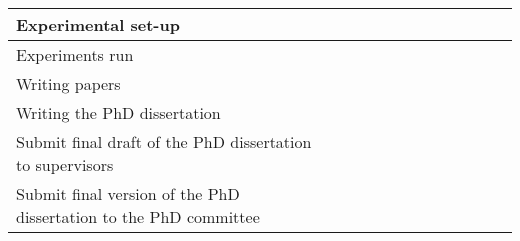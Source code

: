 \documentclass[authoryear,11pt]{elsarticle}
\begin{document}
\begin{table}[h!]
\begin{tabular}{|p{7cm}|c|c|c|c|c|c|c|c|c|c|c|c|}
		\hline
		Experimental set-up &\cellcolor{blue}&\cellcolor{blue}&&\cellcolor{blue}&
		\cellcolor{blue}&&\cellcolor[gray]{0.9}&\cellcolor[gray]{0.9}&&&&\\
		\hline
		Experiments run &&&\cellcolor{blue}&\cellcolor{blue}&&\cellcolor{blue}&\cellcolor[gray]{0.9}&&
		\cellcolor[gray]{0.9}&&&\\
		\hline
		Writing papers &\cellcolor{blue}&&\cellcolor{blue}&&\cellcolor{blue}&\cellcolor{blue}&&&
		\cellcolor[gray]{0.9}&&&\\
		\hline
		Writing the PhD dissertation &&&&\cellcolor{blue}&\cellcolor{blue}&\cellcolor{blue}&
		\cellcolor[gray]{0.9}&\cellcolor[gray]{0.9}&\cellcolor[gray]{0.9}&&&\\
		\hline
		Submit final draft of the PhD dissertation to supervisors &&&&&&&&&&\cellcolor[gray]{0.9}&&\\
		\hline
		Submit final version of the PhD dissertation to the PhD committee &&&&&&&&&&&\cellcolor[gray]{0.9}&\\
		\hline
		
 	\end{tabular}             
 \end{table}
 
	  	


	
\newpage 
{}

\end{document}
